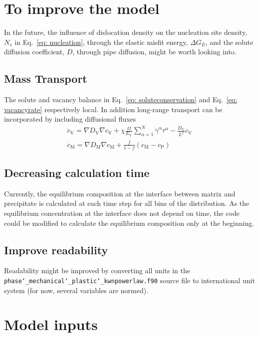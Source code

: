 \documentclass[11pt]{scrartcl}
\newcommand{\eref}[1]{Eq.~\eqref{#1}}
\begin{document}
%



\section{To improve the model}
In the future, the influence of dislocation density on the nucleation site density, $N_s$ in \eref{eq: nucleation}, through the elastic misfit energy, $\Delta G_E$, and the solute diffusion coefficient, $D$, through pipe diffusion, might be worth looking into.

\subsection{Mass Transport}

The solute and vacancy balance in \eref{eq: soluteconservation} and \eref{eq: vacancyrate} respectively local.
In addition long-range transport can be incorporated by including diffusional fluxes
%
\begin{align}
\label{eq: diffusion}
\dot{c}_\text{V} = \nabla D_\text{V} \nabla c_\text{V} + \chi \frac{\Omega}{E_\text{V}} \sum_{\alpha = 1}^{N} \dot{\gamma}^{\alpha} \tau^{\alpha} - \frac{D_\text{V}}{L^2} c_\text{V} \\
\dot{c}_\text{M} = \nabla D_\text{M} \nabla c_\text{M} + \frac{\dot{f}}{1-f}\left(c_\text{M} - c_\text{P}\right)
\end{align} 

\subsection{Decreasing calculation time}
Currently, the equilibrium composition at the interface between matrix and precipitate is calculated at each time step for all bins of the distribution. As the equilibrium concentration at the interface does not depend on time, the code could be modified to calculate the equilibrium composition only at the beginning.
\subsection{Improve readability}
Readability might be improved by converting all units in the \texttt{phase\char`_mechanical\char`_plastic\char`_kwnpowerlaw.f90} source file to international unit system (for now, several variables are normed).
\section{Model inputs} \label{section:inputs}
\end{document}
